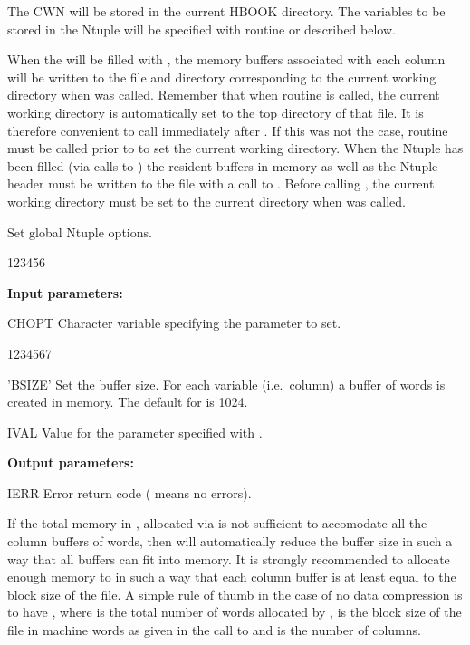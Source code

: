 The CWN{} will be stored in the current HBOOK directory.
The variables to be stored in the Ntuple will be specified
with routine  or  described below.

When the \CWN{} will be filled with , the memory buffers associated
with each column will be written to the file and directory corresponding
to the current working directory when  was called.
Remember that when routine  is called, the current
working directory is automatically set to the
top directory of that file.
It is therefore convenient to call  immediately after .
If this was not the case, routine  must be called prior to
 to set the current working directory.
When the Ntuple has been filled (via calls to )
the resident buffers in memory as well as the Ntuple header
must be written to the file with a call to .
Before calling , the current working directory
must be set to the current directory when  was called.


\Action
Set global Ntuple options.

\begin{DLttc}{123456}
\item[{\rm\bf Input parameters:}]
\item[CHOPT] Character variable specifying the parameter to set.
   \begin{DLttc}{1234567}
     \item['BSIZE'] Set the buffer size. For each variable (i.e.\ column)
                    a buffer of  words is created in memory.
                    The default for  is 1024.
   \end{DLttc}
\item[IVAL]   Value for the parameter specified with .
\item[{\rm\bf Output parameters:}]
\item[IERR]   Error return code ( means no errors).
\end{DLttc}

If the total memory in ,
%
allocated via 
is not sufficient to accomodate all the column buffers of  words,
then  will automatically reduce the buffer size in such a way that
 all buffers can fit into
memory.
It is strongly recommended to allocate enough memory to 
in such a way that each column buffer is at least equal to the block size of
the file.
A simple rule of thumb in the case of no data compression is to have
\mbox{}, where 
is the total number of words allocated
by ,  is the block size of the file in machine words
as given in the call to   and  is the number of columns.

